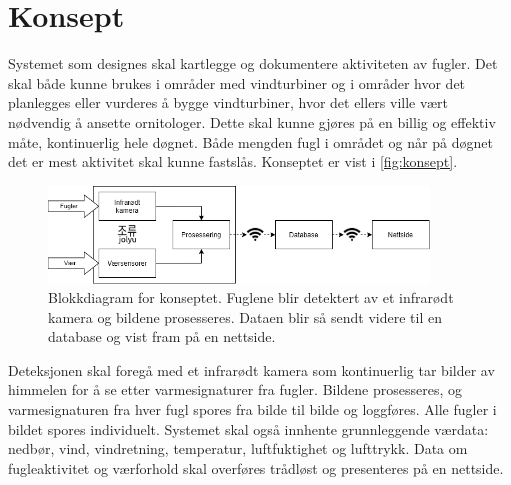 \section{Konsept}
\label{sec:konsept}

Systemet som designes skal kartlegge og dokumentere aktiviteten av fugler. Det skal både kunne brukes i områder med vindturbiner og i områder hvor det planlegges eller vurderes å bygge vindturbiner, hvor det ellers ville vært nødvendig å ansette ornitologer. Dette skal kunne gjøres på en billig og effektiv måte, kontinuerlig hele døgnet. Både mengden fugl i området og når på døgnet det er mest aktivitet skal kunne fastslås. Konseptet er vist i \autoref{fig:konsept}.


\begin{figure}[H]
    \centering
    \includegraphics[width=0.9\textwidth]{konsept/diagram_konsept_v4.png}
    \caption{Blokkdiagram for konseptet. Fuglene blir detektert av et infrarødt kamera og bildene prosesseres. Dataen blir så sendt videre til en database og vist fram på en nettside.}
    \label{fig:konsept}
\end{figure}


Deteksjonen skal foregå med et infrarødt kamera som kontinuerlig tar bilder av himmelen for å se etter varmesignaturer fra fugler. Bildene prosesseres, og varmesignaturen fra hver fugl spores fra bilde til bilde og loggføres. Alle fugler i bildet spores individuelt. Systemet skal også innhente grunnleggende værdata: nedbør, vind, vindretning, temperatur, luftfuktighet og lufttrykk. Data om fugleaktivitet og værforhold skal overføres trådløst og presenteres på en nettside.




